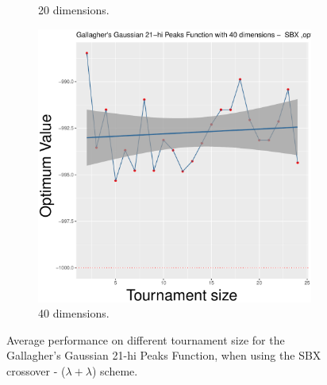 \begin{figure}[t]
\begin{subfigure}[b]{0.33\textwidth}
		\caption{20 dimensions.}
	\end{subfigure}
	\begin{subfigure}[b]{0.33\textwidth}
		\centering
		\includegraphics[width=\textwidth]{img/2n2n-40D/multimodal_2n2n_22_dim_40.pdf}
		\caption{40 dimensions.}
	\end{subfigure}
	\caption{Average performance on different tournament size for the Gallagher's Gaussian 21-hi Peaks Function, when using the SBX crossover - ($\lambda + \lambda$) scheme.}
	\label{sbx-22-B}
\end{figure}

